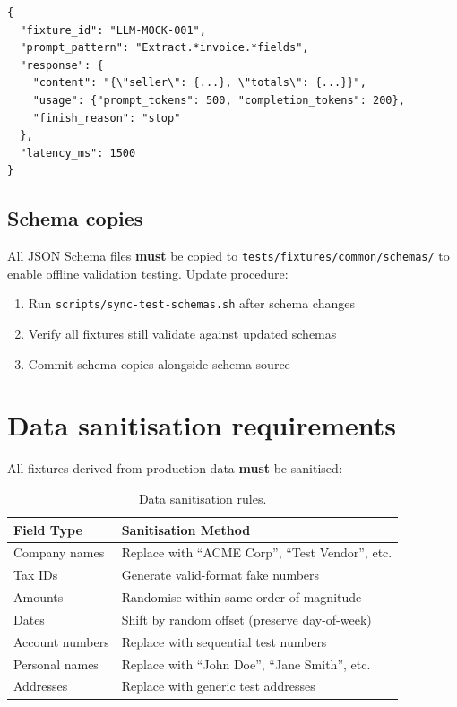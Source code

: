 \begin{lstlisting}[basicstyle=\ttfamily\small,caption={Mock LLM response fixture.}]
{
  "fixture_id": "LLM-MOCK-001",
  "prompt_pattern": "Extract.*invoice.*fields",
  "response": {
    "content": "{\"seller\": {...}, \"totals\": {...}}",
    "usage": {"prompt_tokens": 500, "completion_tokens": 200},
    "finish_reason": "stop"
  },
  "latency_ms": 1500
}
\end{lstlisting}

\subsection{Schema copies}

All JSON Schema files \textbf{must} be copied to \texttt{tests/fixtures/common/schemas/}
to enable offline validation testing. Update procedure:

\begin{enumerate}
  \item Run \texttt{scripts/sync-test-schemas.sh} after schema changes
  \item Verify all fixtures still validate against updated schemas
  \item Commit schema copies alongside schema source
\end{enumerate}

\section{Data sanitisation requirements}

All fixtures derived from production data \textbf{must} be sanitised:

\begin{table}[htbp]
\centering
\caption{Data sanitisation rules.}
\label{tab:sanitisation}
\footnotesize
\begin{tabularx}{\linewidth}{@{}l X@{}}
\toprule
\textbf{Field Type} & \textbf{Sanitisation Method} \\ \midrule
Company names & Replace with ``ACME Corp'', ``Test Vendor'', etc. \\
Tax IDs & Generate valid-format fake numbers \\
Amounts & Randomise within same order of magnitude \\
Dates & Shift by random offset (preserve day-of-week) \\
Account numbers & Replace with sequential test numbers \\
Personal names & Replace with ``John Doe'', ``Jane Smith'', etc. \\
Addresses & Replace with generic test addresses \\
\bottomrule
\end{tabularx}
\end{table}

